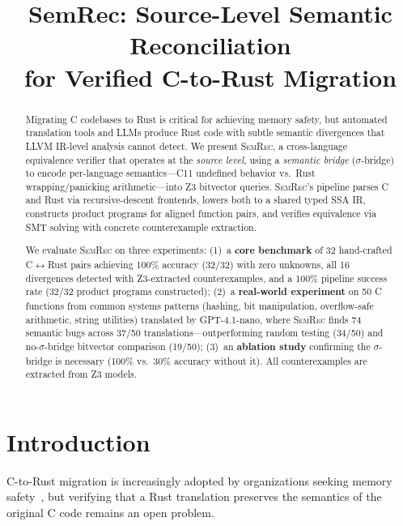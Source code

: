 \documentclass[11pt,a4paper]{article}
\title{\textbf{SemRec: Source-Level Semantic Reconciliation\\for Verified C-to-Rust Migration}}
\date{}
\begin{document}
\maketitle

\begin{abstract}
Migrating C codebases to Rust is critical for achieving memory safety,
but automated translation tools and LLMs produce Rust code with subtle semantic
divergences that LLVM IR-level analysis cannot detect. We present \textsc{SemRec},
a cross-language equivalence verifier that operates at the \emph{source level},
using a \emph{semantic bridge} ($\sigma$-bridge) to encode per-language
semantics---C11 undefined behavior vs.\ Rust wrapping/panicking arithmetic---into
Z3 bitvector queries. \textsc{SemRec}'s pipeline parses C and Rust via
recursive-descent frontends, lowers both to a shared typed SSA IR, constructs
product programs for aligned function pairs, and verifies equivalence via SMT
solving with concrete counterexample extraction.

We evaluate \textsc{SemRec} on three experiments:
(1)~a \textbf{core benchmark} of 32 hand-crafted C$\leftrightarrow$Rust pairs
achieving 100\% accuracy (32/32) with zero unknowns, all 16 divergences
detected with Z3-extracted counterexamples, and a 100\% pipeline success rate
(32/32 product programs constructed);
(2)~a \textbf{real-world experiment} on 50 C functions from common systems
patterns (hashing, bit manipulation, overflow-safe arithmetic, string utilities)
translated by GPT-4.1-nano, where \textsc{SemRec} finds 74 semantic bugs across
37/50 translations---outperforming random testing (34/50) and
no-$\sigma$-bridge bitvector comparison (19/50);
(3)~an \textbf{ablation study} confirming the $\sigma$-bridge is necessary
(100\% vs.\ 30\% accuracy without it).
All counterexamples are extracted from Z3 models.
\end{abstract}

\section{Introduction}\label{sec:intro}

C-to-Rust migration is increasingly adopted by organizations seeking memory
safety~\cite{chromium2019memory, microsoft2019safety, nsa2022memory}, but
verifying that a Rust translation preserves the semantics of the original
C code remains an open problem.
\end{document}
